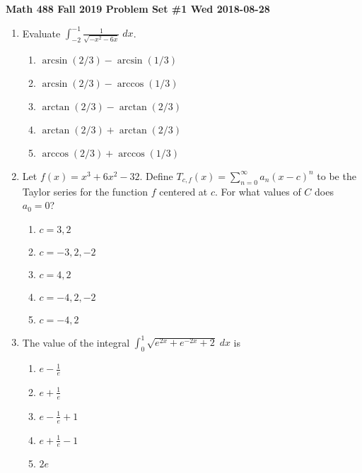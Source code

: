 \documentclass[letterpaper, 12pt]{amsart}
\begin{document}
\noindent
\textbf{Math 488 Fall 2019 \hfill Problem Set \#1 \hfill Wed 2018-08-28}

\vspace*{0.25cm}
\begin{enumerate}[leftmargin=*,itemsep=0.5cm]
  \item Evaluate $\displaystyle \int_{-2}^{-1} \frac{1}{\sqrt{-x^2-6x}}\;dx$.
  
    \vspace*{0.15cm}
    \begin{enumerate}[itemsep=0.15cm] 
      \item $\arcsin(2/3)-\arcsin(1/3)$
      \item $\arcsin(2/3)-\arccos(1/3)$
      \item $\arctan(2/3)-\arctan(2/3)$
      \item $\arctan(2/3)+\arctan(2/3)$
      \item $\arccos(2/3)+\arccos(1/3)$
    \end{enumerate}
    
 \item Let $f(x)=x^3+6x^2-32$. Define $T_{c,f}(x)=\sum_{n=0}^\infty a_n(x-c)^n$ to be
 the Taylor series for the function $f$ centered at $c$. For what values of $C$ does
 $a_0=0$?
 
 \vspace*{0.15cm}
 \begin{enumerate}[itemsep=0.15cm]
   \item $c=3,2$
   \item $c=-3,2,-2$
   \item $c=4,2$
   \item $c=-4,2,-2$
   \item $c=-4,2$
  \end{enumerate}
  
  \item The value of the integral $\displaystyle \int_0^1\sqrt{e^{2x}+e^{-2x}+2} \;dx$ is
  
    \vspace*{0.15cm}
    \begin{enumerate}[itemsep=0.15cm]
      \item $e-\frac{1}{e}$
      \item $e+\frac{1}{e}$
      \item $e-\frac{1}{e}+1$
      \item $e+\frac{1}{e}-1$
      \item $2e$
    \end{enumerate}
 

\end{enumerate}
\end{document}
